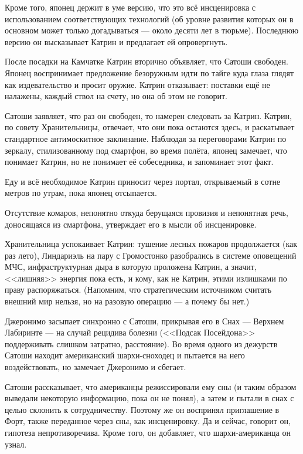Кроме того, японец держит в уме версию, что это всё инсценировка с использованием соответствующих технологий
(об уровне развития которых он в основном может только догадываться --- около десяти лет в тюрьме).
Последнюю версию он высказывает Катрин и предлагает ей опровергнуть.

После посадки на Камчатке Катрин вторично объявляет, что Сатоши свободен.
Японец воспринимает предложение безоружным идти по тайге куда глаза глядят как издевательство и просит оружие.
Катрин отказывает: поставки ещё не налажены, каждый ствол на счету, но она об этом не говорит.

Сатоши заявляет, что раз он свободен, то намерен следовать за Катрин. Катрин, по совету Хранительницы, отвечает,
что они пока остаются здесь, и раскатывает стандартное антимоскитное заклинание.
Наблюдая за переговорами Катрин по зеркалу, стилизованному под смартфон, во время полёта, японец замечает,
что понимает Катрин, но не понимает её собеседника, и запоминает этот факт.

Еду и всё необходимое Катрин приносит через портал, открываемый в сотне метров по утрам, пока японец отсыпается.

Отсутствие комаров, непонятно откуда берущаяся провизия и непонятная речь, доносящаяся из смартфона,
утверждает его в мысли об инсценировке.

Хранительница успокаивает Катрин: тушение лесных пожаров продолжается (как раз лето),
Линдариэль на пару с Громостонко разобрались в системе оповещений МЧС, инфраструктурная дыра в которую проложена Катрин,
а значит, <<лишняя>> энергия пока есть, и кому, как не Катрин, этими излишками по праву распоряжаться.
(Напомним, что стратегическим источником считать внешний мир нельзя, но на разовую операцию --- а почему бы нет.)


Джеронимо засыпает синхронно с Сатоши, прикрывая его в Снах --- Верхнем Лабиринте --- на случай рецидива болезни
(<<Подсак Посейдона>> поддерживать слишком затратно, расстояние).
Во время одного из дежурств Сатоши находит американский шархи-сноходец и пытается на него воздействовать,
но замечает Джеронимо и сбегает.

Сатоши рассказывает, что американцы режиссировали ему сны (и таким образом выведали некоторую информацию, пока он не понял),
а затем и пытали в снах с целью склонить к сотрудничеству. Поэтому же он воспринял приглашение в Форт,
также переданное через сны, как инсценировку. Да и сейчас, говорит он, гипотеза непротиворечива.
Кроме того, он добавляет, что шархи-американца он узнал.

